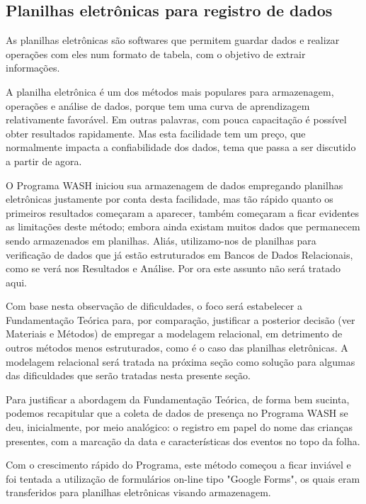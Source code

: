 \subsection[Planilhas eletrônicas para registro de dados]{Planilhas eletrônicas para registro de dados}\label{Planilhas eletrônicas para registro de dados}
As planilhas eletrônicas são softwares que permitem guardar dados e realizar operações com eles num formato de tabela, com o objetivo de  extrair informações.

A planilha eletrônica é um dos métodos mais populares para armazenagem, operações e análise de dados, porque tem uma curva de aprendizagem relativamente favorável. Em outras palavras, com pouca capacitação é possível obter resultados rapidamente. Mas esta facilidade tem um preço, que normalmente impacta a confiabilidade dos dados, tema que passa a ser discutido a partir de agora.

O Programa WASH iniciou sua armazenagem de dados empregando planilhas eletrônicas justamente por conta desta facilidade, mas tão rápido quanto os primeiros resultados começaram a aparecer, também começaram a ficar evidentes as limitações deste método; embora ainda existam muitos dados que permanecem sendo armazenados em planilhas. Aliás, utilizamo-nos de planilhas para verificação de dados que já estão estruturados em Bancos de Dados Relacionais, como se verá nos Resultados e Análise. Por ora este assunto não será tratado aqui.

Com base nesta observação de dificuldades, o foco  será estabelecer a Fundamentação Teórica para, por comparação, justificar a posterior decisão (ver Materiais e Métodos) de empregar a modelagem relacional, em detrimento de outros métodos menos estruturados, como é o caso das planilhas eletrônicas. A modelagem relacional será tratada na próxima seção como solução para algumas das dificuldades que serão tratadas nesta presente seção.

Para justificar a abordagem da Fundamentação Teórica, de forma bem sucinta, podemos recapitular que a coleta de dados de presença no  Programa WASH se deu, inicialmente, por meio analógico: o registro em papel do nome das crianças presentes, com a marcação da data e características dos eventos no topo da folha.

Com o crescimento rápido do Programa, este método começou a ficar inviável e foi tentada a utilização de formulários on-line tipo "Google Forms", os quais eram transferidos para planilhas eletrônicas visando armazenagem.

